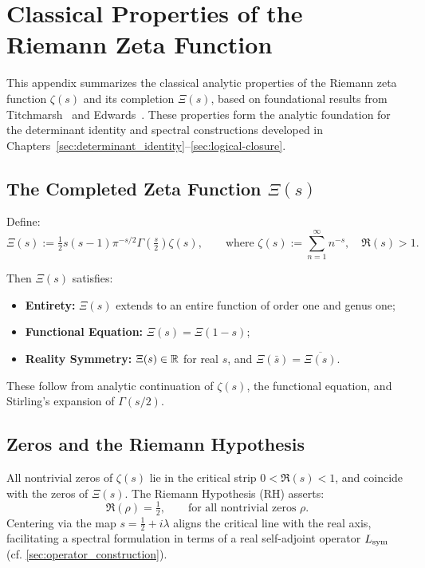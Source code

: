 \section{Classical Properties of the Riemann Zeta Function}
\label{app:zeta-function-background}

This appendix summarizes the classical analytic properties of the Riemann zeta function \( \zeta(s) \) and its completion \( \Xi(s) \), based on foundational results from Titchmarsh~\cite{Titchmarsh1986Zeta} and Edwards~\cite{Edwards1974Zeta}. These properties form the analytic foundation for the determinant identity and spectral constructions developed in Chapters~\ref{sec:determinant_identity}–\ref{sec:logical-closure}.

\subsection*{The Completed Zeta Function \( \Xi(s) \)}

Define:
\[
\Xi(s) := \tfrac{1}{2} s(s - 1) \pi^{-s/2} \Gamma\left( \tfrac{s}{2} \right) \zeta(s),
\qquad \text{where } \zeta(s) := \sum_{n=1}^\infty n^{-s}, \quad \Re(s) > 1.
\]

Then \( \Xi(s) \) satisfies:
\begin{itemize}
  \item \textbf{Entirety:} \( \Xi(s) \) extends to an entire function of order one and genus one;
  \item \textbf{Functional Equation:} \( \Xi(s) = \Xi(1 - s) \);
  \item \textbf{Reality Symmetry:} \( \Xi(s) \in \mathbb{R} \) for real \( s \), and \( \Xi(\bar{s}) = \overline{\Xi(s)} \).
\end{itemize}

These follow from analytic continuation of \( \zeta(s) \), the functional equation, and Stirling’s expansion of \( \Gamma(s/2) \).

\subsection*{Zeros and the Riemann Hypothesis}

All nontrivial zeros of \( \zeta(s) \) lie in the critical strip \( 0 < \Re(s) < 1 \), and coincide with the zeros of \( \Xi(s) \). The Riemann Hypothesis (RH) asserts:
\[
\Re(\rho) = \tfrac{1}{2}, \qquad \text{for all nontrivial zeros } \rho.
\]
Centering via the map \( s = \tfrac{1}{2} + i\lambda \) aligns the critical line with the real axis, facilitating a spectral formulation in terms of a real self-adjoint operator \( L_{\mathrm{sym}} \) (cf. \cref{sec:operator_construction}).

